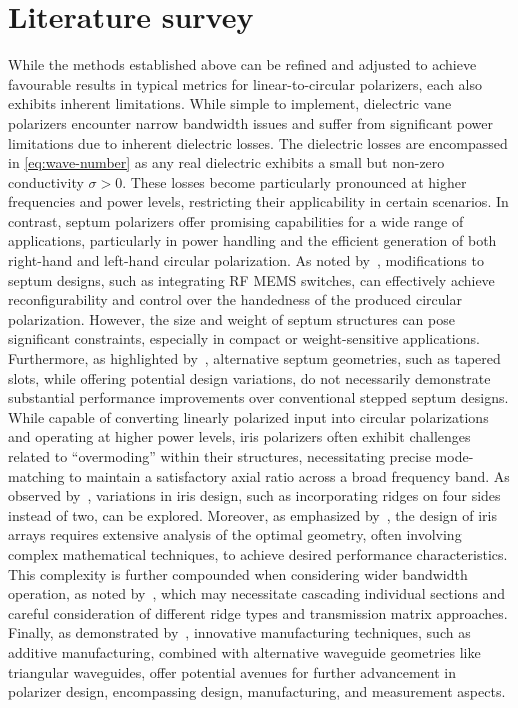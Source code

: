 \documentclass[11pt,a4paper,twoside,openany]{report}
\begin{document}
\section{Literature survey}
While the methods established above can be refined and adjusted to achieve favourable results in typical metrics for linear-to-circular polarizers, each also exhibits inherent limitations. While simple to implement, dielectric vane polarizers encounter narrow bandwidth issues and suffer from significant power limitations due to inherent dielectric losses. The dielectric losses are encompassed in \cref{eq:wave-number} as any real dielectric exhibits a small but non-zero conductivity $\sigma > 0$. These losses become particularly pronounced at higher frequencies and power levels, restricting their applicability in certain scenarios. In contrast, septum polarizers offer promising capabilities for a wide range of applications, particularly in power handling and the efficient generation of both right-hand and left-hand circular polarization. As noted by~\parencite{ruiz-cruz-et-al:compact-reconfigurable-waveguide-circular-polarizer}, modifications to septum designs, such as integrating RF MEMS switches, can effectively achieve reconfigurability and control over the handedness of the produced circular polarization. However, the size and weight of septum structures can pose significant constraints, especially in compact or weight-sensitive applications. Furthermore, as highlighted by~\parencite{wang-et-al:novel-square-rectangle-waveguide-septum-polarizer}, alternative septum geometries, such as tapered slots, while offering potential design variations, do not necessarily demonstrate substantial performance improvements over conventional stepped septum designs. While capable of converting linearly polarized input into circular polarizations and operating at higher power levels, iris polarizers often exhibit challenges related to \enquote{overmoding} within their structures, necessitating precise mode-matching to maintain a satisfactory axial ratio across a broad frequency band. As observed by~\parencite{song-et-al:design-of-wideband-quad-ridge-waveguide-polarizer}, variations in iris design, such as incorporating ridges on four sides instead of two, can be explored. Moreover, as emphasized by~\parencite{virone-et-al:optimum-iris-set-concept-for-waveguide-polarizers}, the design of iris arrays requires extensive analysis of the optimal geometry, often involving complex mathematical techniques, to achieve desired performance characteristics. This complexity is further compounded when considering wider bandwidth operation, as noted by~\parencite{piltyay-et-al:new-tunable-iris-post-square-waveguide-polarizers-for-satelliste-information-systems}, which may necessitate cascading individual sections and careful consideration of different ridge types and transmission matrix approaches. Finally, as demonstrated by~\parencite{deutschmann-arne:broadband-septum-polarizer-with-triangular-common-port}, innovative manufacturing techniques, such as additive manufacturing, combined with alternative waveguide geometries like triangular waveguides, offer potential avenues for further advancement in polarizer design, encompassing design, manufacturing, and measurement aspects.
\end{document}
